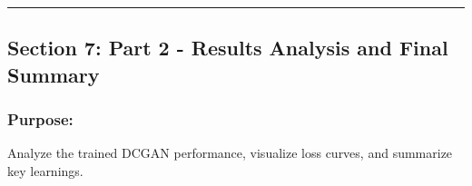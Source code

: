 \documentclass[11pt]{article}
\begin{document}
    \begin{center}\rule{0.5\linewidth}{0.5pt}\end{center}

\subsection{Section 7: Part 2 - Results Analysis and Final
Summary}\label{section-7-part-2---results-analysis-and-final-summary}

\subsubsection{Purpose:}\label{purpose}

Analyze the trained DCGAN performance, visualize loss curves, and
summarize key learnings.
\end{document}
